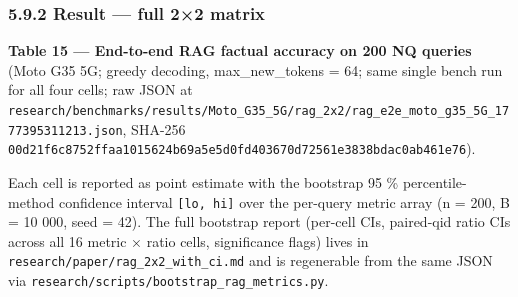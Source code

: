 \subsubsection{5.9.2 Result --- full 2×2 matrix}\label{result-full-22-matrix}

\textbf{Table 15 --- End-to-end RAG factual accuracy on 200 NQ queries} (Moto
G35 5G; greedy decoding, max\_new\_tokens = 64; same single bench run for all
four cells; raw JSON at
\texttt{research/benchmarks/results/Moto\_G35\_5G/rag\_2x2/rag\_e2e\_moto\_g35\_5G\_1777395311213.json},
SHA-256
\texttt{00d21f6c8752ffaa1015624b69a5e5d0fd403670d72561e3838bdac0ab461e76}).

Each cell is reported as point estimate with the bootstrap 95 \%
percentile-method confidence interval \texttt{{[}lo,\ hi{]}} over the per-query
metric array (n = 200, B = 10 000, seed = 42). The full bootstrap report
(per-cell CIs, paired-qid ratio CIs across all 16 metric × ratio cells,
significance flags) lives in \texttt{research/paper/rag\_2x2\_with\_ci.md} and
is regenerable from the same JSON via
\texttt{research/scripts/bootstrap\_rag\_metrics.py}.

